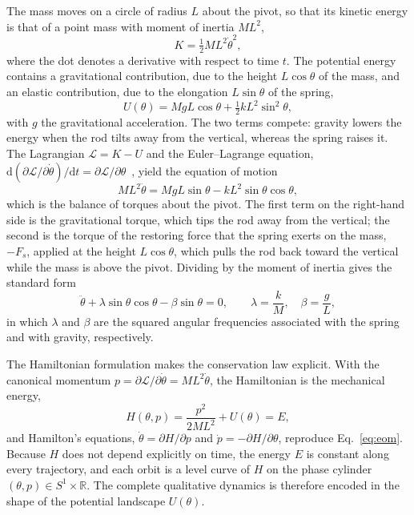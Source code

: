 The mass moves on a circle of radius $L$ about the pivot, so that its kinetic energy is that of a point mass with moment of inertia $ML^{2}$,
\begin{equation}
K = \tfrac12 ML^{2}\dot\theta^{2},
\label{eq:K}
\end{equation}
where the dot denotes a derivative with respect to time $t$. The potential energy contains a gravitational contribution, due to the height $L\cos\theta$ of the mass, and an elastic contribution, due to the elongation $L\sin\theta$ of the spring,
\begin{equation}
U(\theta) = MgL\cos\theta + \tfrac12 kL^{2}\sin^{2}\theta ,
\label{eq:U}
\end{equation}
with $g$ the gravitational acceleration. The two terms compete: gravity lowers the energy when the rod tilts away from the vertical, whereas the spring raises it. The Lagrangian $\mathcal L=K-U$ and the Euler--Lagrange equation, $\mathrm d(\partial\mathcal L/\partial\dot\theta)/\mathrm dt=\partial\mathcal L/\partial\theta$~\cite{Goldstein2002}, yield the equation of motion
\begin{equation}
ML^{2}\ddot\theta = MgL\sin\theta - kL^{2}\sin\theta\cos\theta ,
\label{eq:torque}
\end{equation}
which is the balance of torques about the pivot. The first term on the right-hand side is the gravitational torque, which tips the rod away from the vertical; the second is the torque of the restoring force that the spring exerts on the mass, $-F_s$, applied at the height $L\cos\theta$, which pulls the rod back toward the vertical while the mass is above the pivot. Dividing by the moment of inertia gives the standard form
\begin{equation}
\ddot\theta + \lambda\sin\theta\cos\theta - \beta\sin\theta = 0,
\qquad \lambda = \frac{k}{M},\quad \beta = \frac{g}{L},
\label{eq:eom}
\end{equation}
in which $\lambda$ and $\beta$ are the squared angular frequencies associated with the spring and with gravity, respectively.

The Hamiltonian formulation makes the conservation law explicit. With the canonical momentum $p=\partial\mathcal L/\partial\dot\theta=ML^{2}\dot\theta$, the Hamiltonian is the mechanical energy,
\begin{equation}
H(\theta,p) = \frac{p^{2}}{2ML^{2}} + U(\theta) = E ,
\label{eq:H}
\end{equation}
and Hamilton's equations, $\dot\theta=\partial H/\partial p$ and $\dot p=-\partial H/\partial\theta$, reproduce Eq.~\eqref{eq:eom}. Because $H$ does not depend explicitly on time, the energy $E$ is constant along every trajectory, and each orbit is a level curve of $H$ on the phase cylinder $(\theta,p)\in S^{1}\times\mathbb R$. The complete qualitative dynamics is therefore encoded in the shape of the potential landscape $U(\theta)$.


